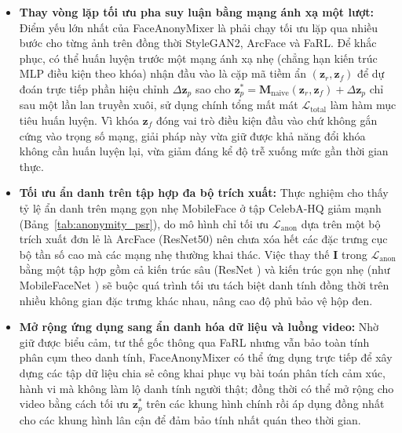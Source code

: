 \documentclass[oneside,a4paper,12pt]{extarticle}
\begin{document}
\begin{itemize}\setlength{\itemsep}{3pt}\setlength{\parskip}{0pt}
    \item \textbf{Thay vòng lặp tối ưu pha suy luận bằng mạng ánh xạ một lượt:} Điểm yếu lớn nhất của FaceAnonyMixer là phải chạy tối ưu lặp qua nhiều bước cho từng ảnh trên đồng thời StyleGAN2, ArcFace và FaRL. Để khắc phục, có thể huấn luyện trước một mạng ánh xạ nhẹ (chẳng hạn kiến trúc MLP điều kiện theo khóa) nhận đầu vào là cặp mã tiềm ẩn $(\mathbf{z}_r, \mathbf{z}_f)$ để dự đoán trực tiếp phần hiệu chỉnh $\Delta \mathbf{z}_p$ sao cho $\mathbf{z}_p^* = \mathbf{M}_{\text{naive}}(\mathbf{z}_r, \mathbf{z}_f) + \Delta \mathbf{z}_p$ chỉ sau một lần lan truyền xuôi, sử dụng chính tổng mất mát $\mathcal{L}_{\text{total}}$ làm hàm mục tiêu huấn luyện. Vì khóa $\mathbf{z}_f$ đóng vai trò điều kiện đầu vào chứ không gắn cứng vào trọng số mạng, giải pháp này vừa giữ được khả năng đổi khóa không cần huấn luyện lại, vừa giảm đáng kể độ trễ xuống mức gần thời gian thực.

    \item \textbf{Tối ưu ẩn danh trên tập hợp đa bộ trích xuất:} Thực nghiệm cho thấy tỷ lệ ẩn danh trên mạng gọn nhẹ MobileFace ở tập CelebA-HQ giảm mạnh (Bảng~\ref{tab:anonymity_psr}), do mô hình chỉ tối ưu $\mathcal{L}_{\text{anon}}$ dựa trên một bộ trích xuất đơn lẻ là ArcFace (ResNet50) \cite{deng2019arcface} nên chưa xóa hết các đặc trưng cục bộ tần số cao mà các mạng nhẹ thường khai thác. Việc thay thế $\mathbf{I}$ trong $\mathcal{L}_{\text{anon}}$ bằng một tập hợp gồm cả kiến trúc sâu (ResNet \cite{he2016resnet}) và kiến trúc gọn nhẹ (như MobileFaceNet \cite{chen2018mobileface}) sẽ buộc quá trình tối ưu tách biệt danh tính đồng thời trên nhiều không gian đặc trưng khác nhau, nâng cao độ phủ bảo vệ hộp đen.

    \item \textbf{Mở rộng ứng dụng sang ẩn danh hóa dữ liệu và luồng video:} Nhờ giữ được biểu cảm, tư thế gốc thông qua FaRL nhưng vẫn bảo toàn tính phân cụm theo danh tính, FaceAnonyMixer có thể ứng dụng trực tiếp để xây dựng các tập dữ liệu chia sẻ công khai phục vụ bài toán phân tích cảm xúc, hành vi mà không làm lộ danh tính người thật; đồng thời có thể mở rộng cho video bằng cách tối ưu $\mathbf{z}_p^*$ trên các khung hình chính rồi áp dụng đồng nhất cho các khung hình lân cận để đảm bảo tính nhất quán theo thời gian.
\end{itemize}
\end{document}
